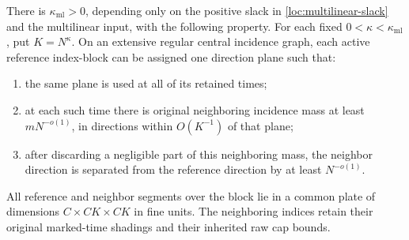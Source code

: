 \begin{lemma}
\label{loc:short-block-plane}
There is $\kappa_{\mathrm{ml}}>0$, depending only on the positive
slack in \eqref{loc:multilinear-slack} and the multilinear input,
with the following property.  For each fixed
$0<\kappa<\kappa_{\mathrm{ml}}$, put $K=N^\kappa$.  On an extensive
regular central incidence graph, each active reference index-block
can be assigned one direction plane such that:
\begin{enumerate}
 \item the same plane is used at all of its retained times;
 \item at each such time there is original neighboring incidence mass
 at least $mN^{-o(1)}$, in directions within $O(K^{-1})$ of that plane;
 \item after discarding a negligible part of this neighboring mass,
 the neighbor direction is separated from the reference direction
 by at least $N^{-o(1)}$.
\end{enumerate}
All reference and neighbor segments over the block lie in a common
plate of dimensions $C\times CK\times CK$ in fine units.  The
neighboring indices retain their original marked-time shadings and
their inherited raw cap bounds.
\end{lemma}

